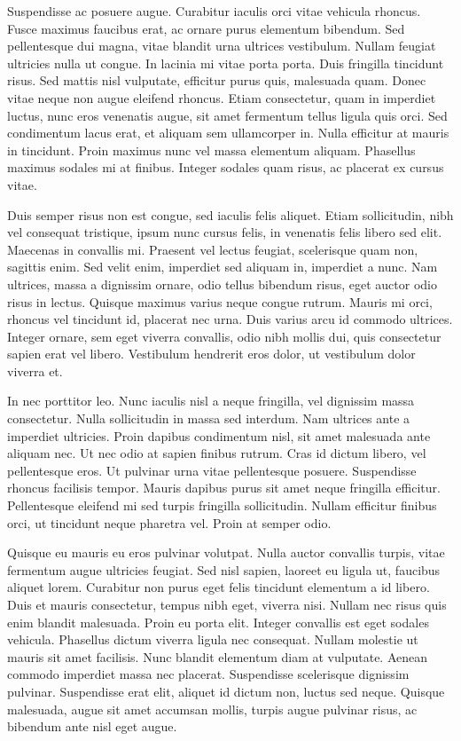 Suspendisse ac posuere augue. Curabitur iaculis orci vitae vehicula rhoncus.
Fusce maximus faucibus erat, ac ornare purus elementum bibendum. Sed
pellentesque dui magna, vitae blandit urna ultrices vestibulum. Nullam feugiat
ultricies nulla ut congue. In lacinia mi vitae porta porta. Duis fringilla
tincidunt risus. Sed mattis nisl vulputate, efficitur purus quis, malesuada
quam. Donec vitae neque non augue eleifend rhoncus. Etiam consectetur, quam in
imperdiet luctus, nunc eros venenatis augue, sit amet fermentum tellus ligula
quis orci. Sed condimentum lacus erat, et aliquam sem ullamcorper in. Nulla
efficitur at mauris in tincidunt. Proin maximus nunc vel massa elementum
aliquam. Phasellus maximus sodales mi at finibus. Integer sodales quam risus,
ac placerat ex cursus vitae.

Duis semper risus non est congue, sed iaculis felis aliquet. Etiam
sollicitudin, nibh vel consequat tristique, ipsum nunc cursus felis, in
venenatis felis libero sed elit. Maecenas in convallis mi. Praesent vel lectus
feugiat, scelerisque quam non, sagittis enim. Sed velit enim, imperdiet sed
aliquam in, imperdiet a nunc. Nam ultrices, massa a dignissim ornare, odio
tellus bibendum risus, eget auctor odio risus in lectus. Quisque maximus varius
neque congue rutrum. Mauris mi orci, rhoncus vel tincidunt id, placerat nec
urna. Duis varius arcu id commodo ultrices. Integer ornare, sem eget viverra
convallis, odio nibh mollis dui, quis consectetur sapien erat vel libero.
Vestibulum hendrerit eros dolor, ut vestibulum dolor viverra et.

In nec porttitor leo. Nunc iaculis nisl a neque fringilla, vel dignissim massa
consectetur. Nulla sollicitudin in massa sed interdum. Nam ultrices ante a
imperdiet ultricies. Proin dapibus condimentum nisl, sit amet malesuada ante
aliquam nec. Ut nec odio at sapien finibus rutrum. Cras id dictum libero, vel
pellentesque eros. Ut pulvinar urna vitae pellentesque posuere. Suspendisse
rhoncus facilisis tempor. Mauris dapibus purus sit amet neque fringilla
efficitur. Pellentesque eleifend mi sed turpis fringilla sollicitudin. Nullam
efficitur finibus orci, ut tincidunt neque pharetra vel. Proin at semper odio.

Quisque eu mauris eu eros pulvinar volutpat. Nulla auctor convallis turpis,
vitae fermentum augue ultricies feugiat. Sed nisl sapien, laoreet eu ligula ut,
faucibus aliquet lorem. Curabitur non purus eget felis tincidunt elementum a id
libero. Duis et mauris consectetur, tempus nibh eget, viverra nisi. Nullam nec
risus quis enim blandit malesuada. Proin eu porta elit. Integer convallis est
eget sodales vehicula. Phasellus dictum viverra ligula nec consequat. Nullam
molestie ut mauris sit amet facilisis. Nunc blandit elementum diam at
vulputate. Aenean commodo imperdiet massa nec placerat. Suspendisse scelerisque
dignissim pulvinar. Suspendisse erat elit, aliquet id dictum non, luctus sed
neque. Quisque malesuada, augue sit amet accumsan mollis, turpis augue pulvinar
risus, ac bibendum ante nisl eget augue.


